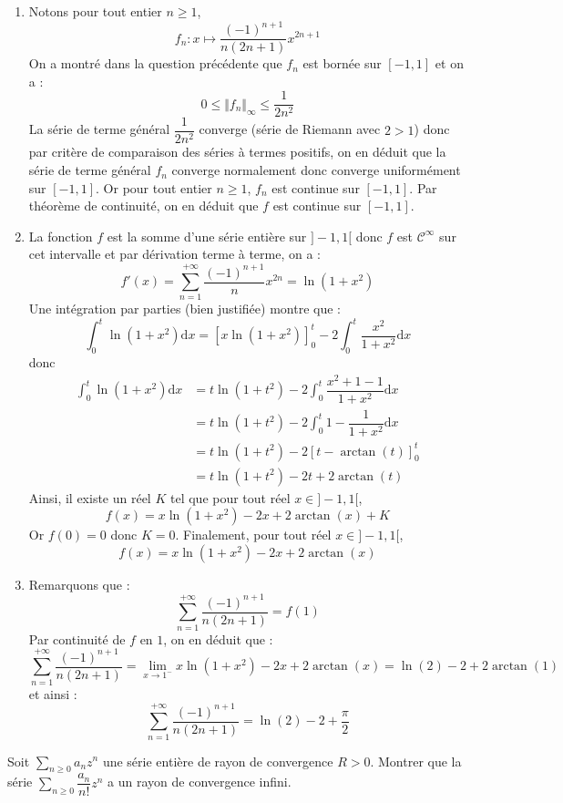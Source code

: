 \documentclass[a4paper,twoside,french,11pt]{VcCours}
\newcommand{\dx}{\text{d}x}
\newcommand{\Sum}[2]{\sum_{#1}^{#2}}
\begin{document}
\begin{enumerate}
\item Notons pour tout entier $n \geq 1$,
$$ f_n : x \mapsto \dfrac{(-1)^{n+1}}{n(2n+1)} x^{2n+1}$$
On a montré dans la question précédente que $f_n$ est bornée sur $[-1,1]$ et on a :
$$ 0 \leq \Vert f_n \Vert_{\infty} \leq  \dfrac{1}{2n^2}$$
La série de terme général $\dfrac{1}{2n^2}$ converge (série de Riemann avec $2>1$) donc par critère de comparaison des séries à termes positifs, on en déduit que la série de terme général $f_n$ converge normalement donc converge uniformément sur $[-1,1]$. Or pour tout entier $n \geq 1$, $f_n$ est continue sur $[-1,1]$. Par théorème de continuité, on en déduit que $f$ est continue sur $[-1,1]$.
\item La fonction $f$ est la somme d'une série entière sur $]-1,1[$ donc $f$ est $\mathcal{C}^{\infty}$ sur cet intervalle et par dérivation terme à terme, on a :
$$ f'(x) = \sum_{n=1}^{+ \infty}  \dfrac{(-1)^{n+1}}{n} x^{2n} = \ln(1+x^2)$$
Une intégration par parties (bien justifiée) montre que :
$$ \int_0^{t} \ln(1+x^2) \dx = \left[ x \ln(1+x^2) \right]_0^t - 2\int_0^t \dfrac{x^2}{1+x^2} \dx$$
donc 
\begin{align*}
 \int_0^{t} \ln(1+x^2) \dx & =  t \ln(1+t^2)  - 2\int_0^t \dfrac{x^2+1-1}{1+x^2} \dx \\
 & = t \ln(1+t^2)  - 2\int_0^t 1 - \dfrac{1}{1+x^2} \dx \\
 & = t \ln(1+t^2) - 2 \left[ t - \arctan(t) \right]_0^t \\
 & = t \ln(1+t^2) - 2t + 2 \arctan(t)
\end{align*}
Ainsi, il existe un réel $K$ tel que pour tout réel $x \in ]-1,1[$,
$$ f(x) = x \ln(1+x^2) - 2x + 2 \arctan(x) + K$$
Or $f(0)=0$ donc $K=0$. Finalement, pour tout réel $x \in ]-1,1[$,
$$ f(x) = x \ln(1+x^2) - 2x + 2 \arctan(x) $$
\item Remarquons que :
$$ \sum_{n=1}^{+ \infty} \dfrac{(-1)^{n+1}}{n(2n+1)}  = f(1)$$
Par continuité de $f$ en $1$, on en déduit que :
$$ \sum_{n=1}^{+ \infty} \dfrac{(-1)^{n+1}}{n(2n+1)} = \lim_{x \rightarrow 1^{-}}  x \ln(1+x^2) - 2x + 2 \arctan(x) =\ln(2)-2+ 2 \arctan(1)$$
et ainsi :
$$ \sum_{n=1}^{+ \infty} \dfrac{(-1)^{n+1}}{n(2n+1)} = \ln(2)-2 + \dfrac{\pi}{2}$$
\end{enumerate}

\begin{Exercice}[$\bigstar$]{} Soit $\Sum{n \geq 0}{} a_n z^n$ une série entière de rayon de convergence $R>0$. Montrer que  la série $\Sum{n \geq 0}{} \dfrac{a_n}{n!}z^n$ a un rayon de convergence infini. 
\end{Exercice}
\end{document}
